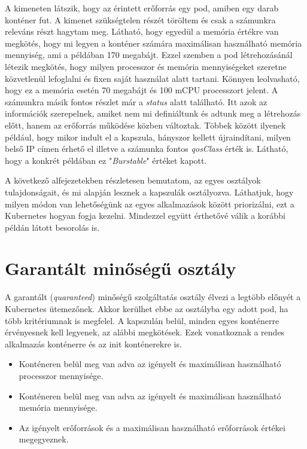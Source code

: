 A kimeneten látszik, hogy az érintett erőforrás egy pod, amiben egy darab konténer fut.
A kimenet szükségtelen részét töröltem és csak a számunkra releváns részt hagytam meg.
Látható, hogy egyedül a memória értékre van megkötés, hogy mi legyen a konténer számára maximálisan használható memória mennyiség, ami a példában 170 megabájt. 
Ezzel szemben a pod létrehozásánál létezik megkötés, hogy milyen processzor és memória mennyiségeket szeretne közvetlenül lefoglalni és fixen saját használat alatt tartani.
Könnyen leolvasható, hogy ez a memória esetén 70 megabájt és 100 mCPU processzort jelent.
A számunkra másik fontos részlet már a \textit{status} alatt található.
Itt azok az információk szerepelnek, amiket nem mi definiáltunk és adtunk meg a létrehozás előtt, hanem az erőforrás működése közben változtak.
Többek között ilyenek például, hogy mikor indult el a kapszula, hányszor kellett újraindítani, milyen belső IP címen érhető el illetve a számunka fontos \textit{qosClass} érték is.
Látható, hogy a konkrét példában ez "\textit{Burstable}" értéket kapott.

\lstset{caption=Adott kapszula minőségosztályának vizsgálata, label=get_qos_example}


A következő alfejezetekben részletesen bemutatom, az egyes osztályok tulajdonságait, és mi alapján lesznek a kapszulák osztályozva.
Láthatjuk, hogy milyen módon van lehetőségünk az egyes alkalmazások között priorizálni, ezt a Kubernetes hogyan fogja kezelni.
Mindezzel együtt érthetővé válik a korábbi példán látott besorolás is.


\section{Garantált minőségű osztály}

A garantált (\textit{quaranteed}) minőségű szolgáltatás osztály élvezi a legtöbb előnyét a Kubernetes ütemezőnek.
Akkor kerülhet ebbe az osztályba egy adott pod, ha több kritériumnak is megfelel.
A kapszulán belül, minden egyes konténerre érvényesnek kell legyenek, az alábbi megkötések. 
Ezek vonatkoznak a rendes alkalmazás konténerre és az init konténerekre is.

\begin{itemize}
    \item Konténeren belül meg van adva az igényelt és maximálisan használható processzor mennyisége.
    \item Konténeren belül meg van adva az igényelt és maximálisan használható memória mennyisége.
    \item Az igényelt erőforrások és a maximálisan használható erőforrások értékei megegyeznek.
\end{itemize}

